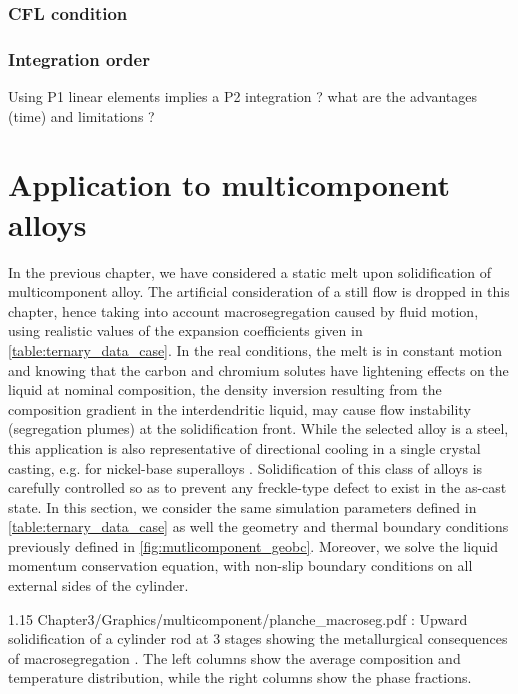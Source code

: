 \subsubsection{CFL condition}
%
\subsubsection{Integration order}
%
Using P1 linear elements implies a P2 integration ? what are the advantages (time) and limitations ?

\section{Application to multicomponent alloys}
In the previous chapter, we have considered a static melt upon solidification of multicomponent alloy. 
The artificial consideration of a still flow is dropped in this chapter, hence taking into account macrosegregation 
caused by fluid motion, using realistic values of the expansion coefficients given in \cref{table:ternary_data_case}.
In the real conditions, the melt is in constant motion and knowing that the carbon and chromium solutes have lightening effects on the liquid 
at nominal composition, the density inversion resulting from the composition gradient in the interdendritic 
liquid, may cause flow instability (segregation plumes) at the solidification front. While the selected alloy 
is a steel, this application is also representative of directional cooling in a single crystal casting, e.g. 
for nickel-base superalloys \citep{beckermann_development_2000}. Solidification of this class of alloys is carefully
controlled so as to prevent any freckle-type defect to exist in the as-cast state.
In this section, we consider the same simulation parameters defined in \cref{table:ternary_data_case} as well the geometry and thermal boundary conditions
previously defined in \cref{fig:mutlicomponent_geobc}. Moreover, we solve the liquid momentum conservation equation, with non-slip boundary conditions
on all external sides of the cylinder.
%
\begin{landscape}
\begin{figureth}
{1.15}
{Chapter3/Graphics/multicomponent/planche_macroseg.pdf}
{: Upward solidification of a cylinder rod  at 3 stages showing the metallurgical consequences 
of macrosegregation . The left columns show the average 
composition and temperature distribution, while the right columns show the phase fractions.}
\label{fig:planche_withmacroseg}
\end{figureth}
\end{landscape}
%
